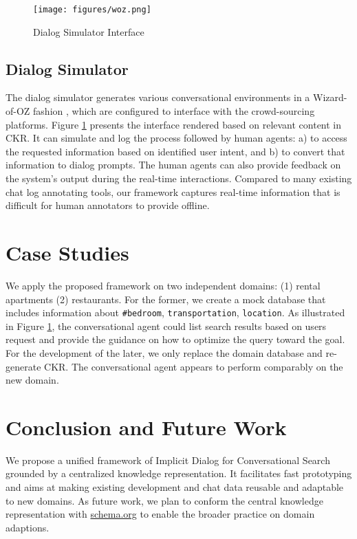 \documentclass[letterpaper]{article} %
\begin{document}
\begin{figure}[!ht]
\centering
\texttt{[image: figures/woz.png]}
\caption{Dialog Simulator Interface}
\label{fig:woz}
\end{figure}

\vspace{-1.52mm}
\subsection{Dialog Simulator}
The dialog simulator generates various conversational environments in a Wizard-of-OZ fashion \cite{schatzmann2005quantitative}, which are configured to interface with the crowd-sourcing platforms. Figure \ref{fig:woz} presents the interface rendered based on relevant content in CKR. It can simulate and log the process followed by human agents: a) to access the requested information based on identified user intent, and b) to convert that information to dialog prompts. The human agents can also provide feedback on the system's output during the real-time interactions. Compared to many existing chat log annotating tools, our framework captures  real-time information that is difficult for human annotators to provide offline. %


\vspace{-0.92mm}
\section{Case Studies}
We apply the proposed framework on two independent domains: (1) rental apartments (2) restaurants. For the former, we create a mock database that includes information about \texttt{\#bedroom}, \texttt{transportation}, \texttt{location}. As illustrated in Figure \ref{fig:woz}, the conversational agent could list search results based on users request and provide the guidance on how to optimize the query toward the goal. For the development of the later, we only replace the domain database and re-generate CKR. The conversational agent appears to perform comparably on the new domain.

\vspace{-1.61mm}
\section{Conclusion and Future Work}
We propose a unified framework of Implicit Dialog for Conversational Search grounded by a centralized knowledge representation. It facilitates fast prototyping and aims at making existing development and chat data reusable and adaptable to new domains. As future work, we plan to conform the central knowledge representation with \url{schema.org} to enable the broader practice on domain adaptions.
\end{document}
